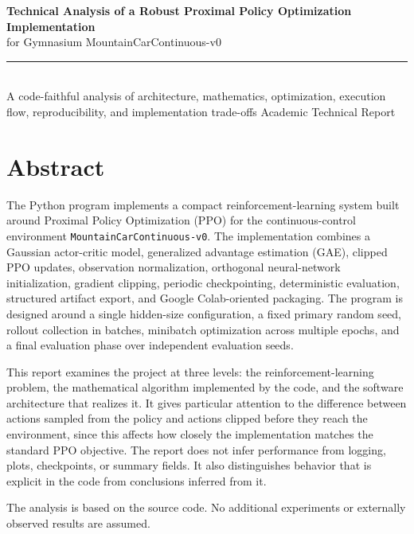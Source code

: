 \documentclass[11pt,a4paper]{article}
\begin{document}
\begin{titlepage}
\centering
\vspace*{2.0cm}
{\LARGE\bfseries Technical Analysis of a Robust Proximal Policy Optimization Implementation\\[0.5em]}
{\Large for Gymnasium MountainCarContinuous-v0\\[1.2em]}
\rule{0.85\textwidth}{0.5pt}\\[1.2em]
{\large A code-faithful analysis of architecture, mathematics, optimization, execution flow, reproducibility, and implementation trade-offs}
\vfill
{\large Academic Technical Report}
\end{titlepage}

\tableofcontents
\clearpage

\section*{Abstract}
The Python program implements a compact reinforcement-learning system built around Proximal Policy Optimization (PPO) for the continuous-control environment \texttt{MountainCarContinuous-v0}. The implementation combines a Gaussian actor-critic model, generalized advantage estimation (GAE), clipped PPO updates, observation normalization, orthogonal neural-network initialization, gradient clipping, periodic checkpointing, deterministic evaluation, structured artifact export, and Google Colab-oriented packaging. The program is designed around a single hidden-size configuration, a fixed primary random seed, rollout collection in batches, minibatch optimization across multiple epochs, and a final evaluation phase over independent evaluation seeds.

This report examines the project at three levels: the reinforcement-learning problem, the mathematical algorithm implemented by the code, and the software architecture that realizes it. It gives particular attention to the difference between actions sampled from the policy and actions clipped before they reach the environment, since this affects how closely the implementation matches the standard PPO objective. The report does not infer performance from logging, plots, checkpoints, or summary fields. It also distinguishes behavior that is explicit in the code from conclusions inferred from it.

The analysis is based on the source code. No additional experiments or externally observed results are assumed.
\end{document}
